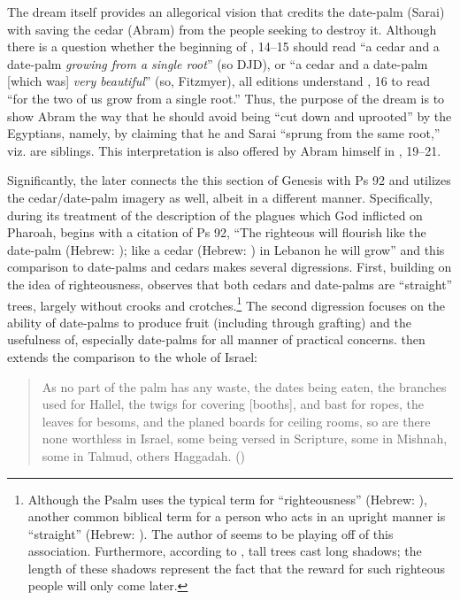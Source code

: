 The dream itself provides an allegorical vision that credits the date-palm (Sarai) with saving the cedar (Abram) from the people seeking to destroy it. Although there is a question whether the beginning of , 14--15 should read  ``a cedar and a date-palm \emph{growing from a single root}'' (so DJD), or  ``a cedar and a date-palm [which was] \emph{very beautiful}'' (so, Fitzmyer), all editions understand , 16 to read  ``for the two of us grow from a single root.'' Thus, the purpose of the dream  is to show Abram the way that he should avoid being ``cut down and uprooted'' by the Egyptians, namely, by claiming that he and Sarai ``sprung from the same root,'' viz. are siblings. This interpretation is also offered by Abram himself in , 19--21.

Significantly, the later \GenRabbah connects the this section of Genesis with Ps 92 and utilizes the cedar/date-palm imagery as well, albeit in a different manner. Specifically, during its treatment of the description of the plagues which God inflicted on Pharoah, \GenRabbah begins with a citation of Ps 92, ``The righteous will flourish like the date-palm (Hebrew: ); like a cedar (Hebrew: ) in Lebanon he will grow'' and this comparison to date-palms and cedars makes several digressions. First, building on the idea of righteousness, \GenRabbah observes that both cedars and date-palms are ``straight'' trees, largely without crooks and crotches.\footnote{Although the Psalm uses the typical term for ``righteousness'' (Hebrew: ), another common biblical term for a person who acts in an upright manner is ``straight'' (Hebrew: ). The author of \GenRabbah seems to be playing off of this association. Furthermore, according to \GenRabbah, tall trees cast long shadows; the length of these shadows represent the fact that the reward for such righteous people will only come later.} The second digression focuses on the ability of date-palms to produce fruit (including through grafting) and the usefulness of, especially date-palms for all manner of practical concerns. \GenRabbah then extends the comparison to the whole of Israel:

\begin{quote}
As no part of the palm has any waste, the dates being eaten, the branches used for Hallel, the twigs for covering [booths], and bast for ropes, the leaves for besoms, and the planed boards for ceiling rooms, so are there none worthless in Israel, some being versed in Scripture, some in Mishnah, some in Talmud, others Haggadah. () %
\end{quote}

